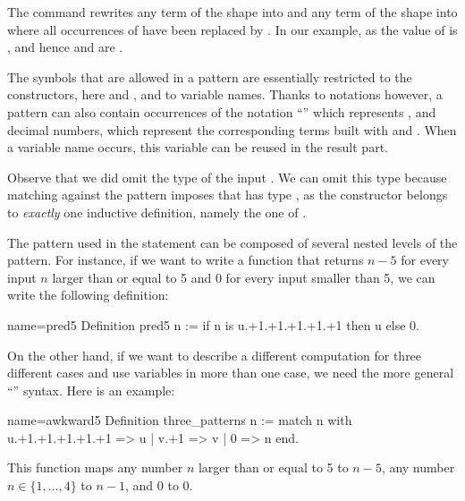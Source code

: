 The  command rewrites any term of the shape
 into  and any term of the shape
 into  where all occurrences of
 have been replaced by .  In our example, as the value of
 is ,  and hence  and  are .


The symbols that are allowed in a pattern are essentially restricted
to the constructors, here  and , and to variable names.
Thanks to notations however, a pattern can also contain
occurrences of the notation ``'' which represents , and
decimal numbers, which represent the corresponding terms built with
 and .  When a variable name occurs, this variable can be
reused in the result part.

Observe that we did omit the type of the input . We can omit this
type because matching
 against  the  pattern imposes that  has type
, as the  constructor belongs to \emph{exactly}
one inductive definition, namely the one of .

The pattern used in the  statement can be composed of
several nested levels of the  pattern.  For instance,
if we want to write a function
that returns \(n-5\) for every input \(n\) larger than or equal to 5 and 0
for every input smaller than 5, we can write the following definition:

\begin{coq}{name=pred5}{}
Definition pred5 n :=
  if n is u.+1.+1.+1.+1.+1 then u else 0.
\end{coq}

On the other hand, if we want to describe a different computation for
three different cases and use variables in more than one case, we need
the more general ``'' syntax.  Here is an
example:

\begin{coq}{name=awkward5}{}
Definition three_patterns n :=
  match n with
    u.+1.+1.+1.+1.+1 => u
  | v.+1 => v
  | 0 => n
  end.
\end{coq}

This function maps any number \(n\) larger than or equal to 5 to \(n-5\),
any number \(n \in \{1, \ldots, 4\}\) to \(n-1\), and \(0\) to \(0\).

